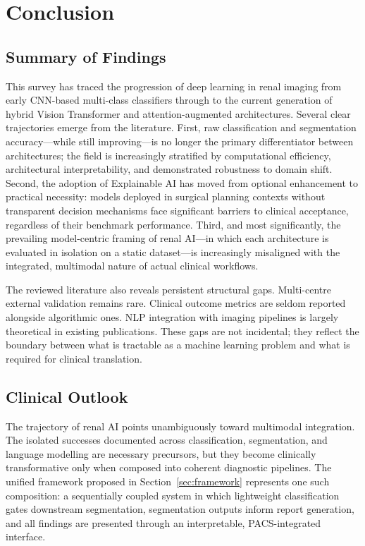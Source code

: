 \documentclass[pdflatex,sn-mathphys-num]{sn-jnl}%
\begin{document}


\section{Conclusion}
\label{sec:conclusion}


\subsection{Summary of Findings}
\label{subsec:summary}

This survey has traced the progression of deep learning in renal imaging from early CNN-based multi-class classifiers through to the current generation of hybrid Vision Transformer and attention-augmented architectures. Several clear trajectories emerge from the literature. First, raw classification and segmentation accuracy---while still improving---is no longer the primary differentiator between architectures; the field is increasingly stratified by computational efficiency, architectural interpretability, and demonstrated robustness to domain shift. Second, the adoption of Explainable AI has moved from optional enhancement to practical necessity: models deployed in surgical planning contexts without transparent decision mechanisms face significant barriers to clinical acceptance, regardless of their benchmark performance. Third, and most significantly, the prevailing model-centric framing of renal AI---in which each architecture is evaluated in isolation on a static dataset---is increasingly misaligned with the integrated, multimodal nature of actual clinical workflows.

The reviewed literature also reveals persistent structural gaps. Multi-centre external validation remains rare. Clinical outcome metrics are seldom reported alongside algorithmic ones. NLP integration with imaging pipelines is largely theoretical in existing publications. These gaps are not incidental; they reflect the boundary between what is tractable as a machine learning problem and what is required for clinical translation.

\subsection{Clinical Outlook}
\label{subsec:outlook}

The trajectory of renal AI points unambiguously toward multimodal integration. The isolated successes documented across classification, segmentation, and language modelling are necessary precursors, but they become clinically transformative only when composed into coherent diagnostic pipelines. The unified framework proposed in Section~\ref{sec:framework} represents one such composition: a sequentially coupled system in which lightweight classification gates downstream segmentation, segmentation outputs inform report generation, and all findings are presented through an interpretable, PACS-integrated interface.
\end{document}
